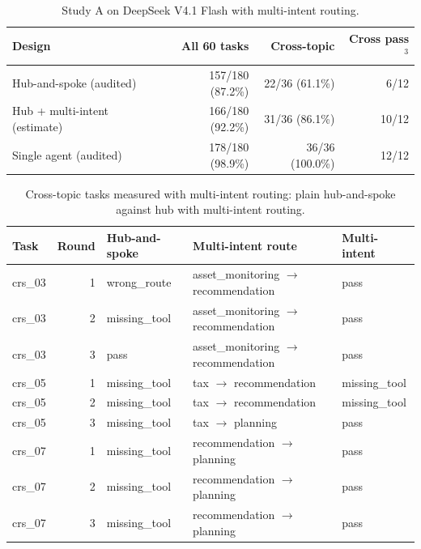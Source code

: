 \documentclass[11pt,a4paper]{article}
\begin{document}
\begin{table}[H]
\centering
\small
\caption{Study A on DeepSeek V4.1 Flash with multi-intent routing.}\label{tab:mi-merged}
\begin{tabular}{lrrr}
\toprule
\textbf{Design} & \textbf{All 60 tasks} & \textbf{Cross-topic} & \textbf{Cross pass$^{3}$} \\
\midrule
Hub-and-spoke (audited) & 157/180 (87.2\%) & 22/36 (61.1\%) & 6/12 \\
Hub + multi-intent (estimate) & 166/180 (92.2\%) & 31/36 (86.1\%) & 10/12 \\
Single agent (audited) & 178/180 (98.9\%) & 36/36 (100.0\%) & 12/12 \\
\bottomrule
\end{tabular}
\end{table}
\begin{table}[H]
\centering
\footnotesize
\caption{Cross-topic tasks measured with multi-intent routing: plain hub-and-spoke against hub with multi-intent routing.}\label{tab:mi-rerun}
\begin{tabular}{lrlll}
\toprule
\textbf{Task} & \textbf{Round} & \textbf{Hub-and-spoke} & \textbf{Multi-intent route} & \textbf{Multi-intent} \\
\midrule
crs\_\allowbreak{}03 & 1 & wrong\_\allowbreak{}route & asset\_\allowbreak{}monitoring $\rightarrow$ recommendation & pass \\
crs\_\allowbreak{}03 & 2 & missing\_\allowbreak{}tool & asset\_\allowbreak{}monitoring $\rightarrow$ recommendation & pass \\
crs\_\allowbreak{}03 & 3 & pass & asset\_\allowbreak{}monitoring $\rightarrow$ recommendation & pass \\
crs\_\allowbreak{}05 & 1 & missing\_\allowbreak{}tool & tax $\rightarrow$ recommendation & missing\_\allowbreak{}tool \\
crs\_\allowbreak{}05 & 2 & missing\_\allowbreak{}tool & tax $\rightarrow$ recommendation & missing\_\allowbreak{}tool \\
crs\_\allowbreak{}05 & 3 & missing\_\allowbreak{}tool & tax $\rightarrow$ planning & pass \\
crs\_\allowbreak{}07 & 1 & missing\_\allowbreak{}tool & recommendation $\rightarrow$ planning & pass \\
crs\_\allowbreak{}07 & 2 & missing\_\allowbreak{}tool & recommendation $\rightarrow$ planning & pass \\
crs\_\allowbreak{}07 & 3 & missing\_\allowbreak{}tool & recommendation $\rightarrow$ planning & pass \\

\end{tabular}
\end{table}
\end{document}
